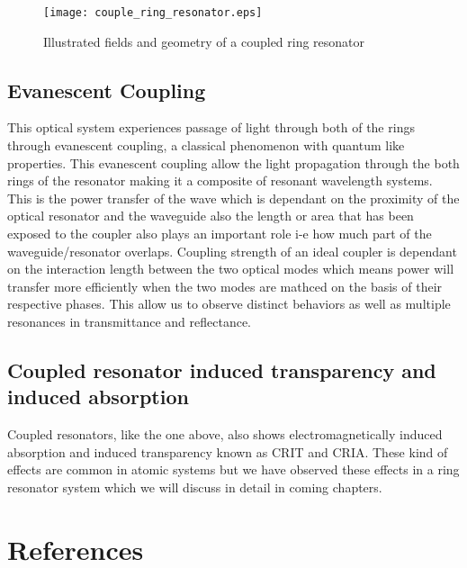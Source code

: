\begin{figure}[t]
\centering
\texttt{[image: couple\_ring\_resonator.eps]}
\caption{Illustrated fields and geometry of a coupled ring resonator}
\end{figure}

\subsection{Evanescent Coupling}
This optical system experiences passage of light through both of the rings through evanescent coupling, a classical phenomenon with quantum like properties. This evanescent coupling allow the light propagation through the both rings of the resonator making it a composite of resonant wavelength systems. This is the power transfer of the wave which is dependant on the proximity of the optical resonator and the waveguide also the length or area that has been exposed to the coupler also plays an important role i-e how much part of the waveguide/resonator overlaps. Coupling strength of an ideal coupler is dependant on the interaction length between the two optical modes which means power will transfer more efficiently when the two modes are mathced on the basis of their respective phases.  This allow us to observe distinct behaviors as well as multiple resonances in transmittance and reflectance. 

\subsection{Coupled resonator induced transparency and induced absorption}
Coupled resonators, like the one above, also shows electromagnetically induced absorption and induced transparency known as CRIT and CRIA. These kind of effects are common in atomic systems but we have observed these effects in a ring resonator system which we will discuss in detail in coming chapters.

\newpage
\section*{References}


